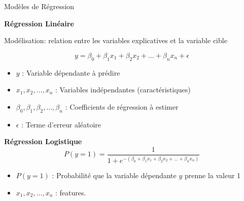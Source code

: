 \documentclass{beamer}
\begin{document}
\begin{frame}{Modèles de Régression}
	
	\textbf{Régression Linéaire}
	
	\vspace{0.5cm}
	
	Modélisation: relation entre les variables explicatives et la variable cible

	\[
	y = \beta_0 + \beta_1x_1 + \beta_2x_2 + \ldots + \beta_nx_n + \epsilon
	\]
	
	\begin{itemize}
		\item $y$ : Variable dépendante à prédire
		\item $x_1, x_2, \ldots, x_n$ : Variables indépendantes (caractéristiques)
		\item $\beta_0, \beta_1, \beta_2, \ldots, \beta_n$ : Coefficients de régression à estimer
		\item $\epsilon$ : Terme d'erreur aléatoire
	\end{itemize}
	
	\vspace{0.5cm}
	
	\textbf{Régression Logistique}
	\[
	P(y=1) = \frac{1}{1 + e^{-(\beta_0 + \beta_1x_1 + \beta_2x_2 + \ldots + \beta_nx_n)}}
	\]
	
	\begin{itemize}
		\item $P(y=1)$ : Probabilité que la variable dépendante $y$ prenne la valeur 1
		\item $x_1, x_2, \ldots, x_n$ : features.
	\end{itemize}
	
\end{frame}
\end{document}
